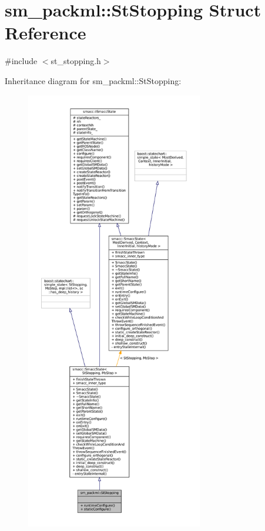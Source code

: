 \hypertarget{structsm__packml_1_1StStopping}{}\section{sm\+\_\+packml\+:\+:St\+Stopping Struct Reference}
\label{structsm__packml_1_1StStopping}


{\ttfamily \#include $<$st\+\_\+stopping.\+h$>$}



Inheritance diagram for sm\+\_\+packml\+:\+:St\+Stopping\+:
\nopagebreak
\begin{figure}[H]
\begin{center}
\leavevmode
\includegraphics[height=550pt]{structsm__packml_1_1StStopping__inherit__graph}
\end{center}
\end{figure}


